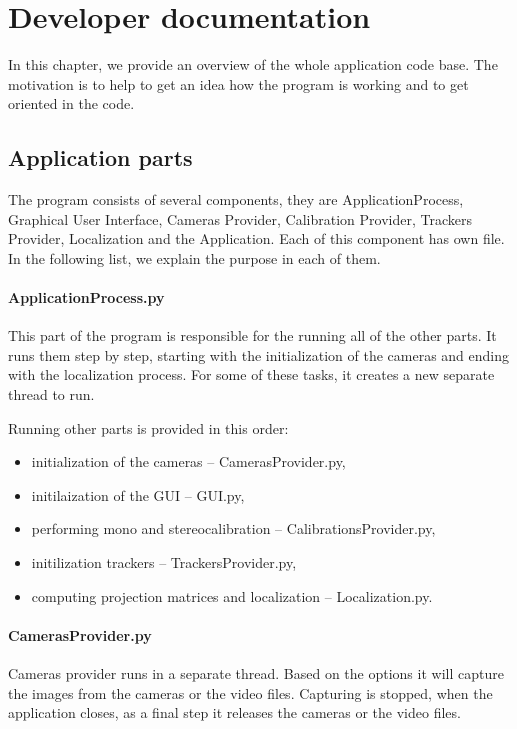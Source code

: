 \chapter{Developer documentation}

In this chapter, we provide an overview of the whole application code base. The
motivation is to help to get an idea how the program is working and to get
oriented in the code.

\section{Application parts}

The program consists of several components, they are ApplicationProcess,
Graphical User Interface, Cameras Provider, Calibration Provider, Trackers
Provider, Localization and the Application. Each of this component has own
file. In the following list, we explain the purpose in each of them.

\subsubsection*{ApplicationProcess.py}

This part of the program is responsible for the running all of the other parts.
It runs them step by step, starting with the initialization of the cameras and
ending with the localization process. For some of these tasks, it creates a new
separate thread to run.

Running other parts is provided in this order: 
\begin{itemize} 
\item initialization of the cameras -- CamerasProvider.py, \item initilaization
of the GUI -- GUI.py, \item performing mono and stereocalibration --
CalibrationsProvider.py, \item initilization trackers -- TrackersProvider.py,
\item computing projection matrices and localization -- Localization.py.
\end{itemize}

\subsubsection*{CamerasProvider.py}

Cameras provider runs in a separate thread. Based on the options it will
capture the images from the cameras or the video files. Capturing is stopped,
when the application closes, as a final step it releases the cameras or the
video files.

